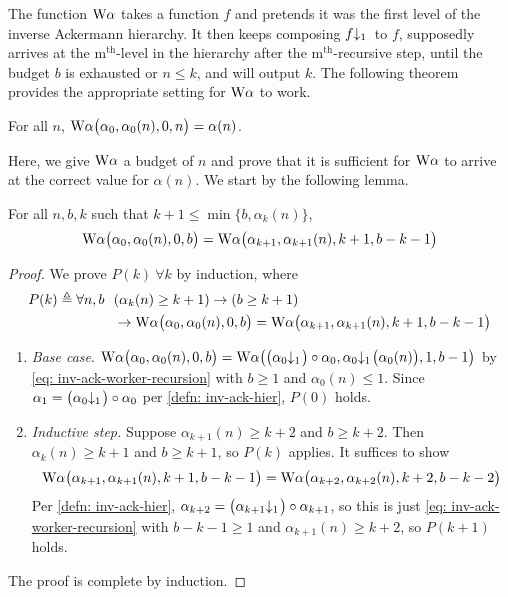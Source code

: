 The function $\text{W}\alpha$ takes a function $f$ and pretends it was the first level of the inverse Ackermann hierarchy. It then keeps composing $\cdt{f}{1}\ $ to $f$, supposedly arrives at the $\text{m}^{\text{th}}$-level in the hierarchy after the $\text{m}^{\text{th}}$-recursive step, until the budget $b$ is exhausted or $n\le k$, and will output $k$. The following theorem provides the appropriate setting for $\text{W}\alpha$ to work.
\begin{thm} \label{thm: inv-ack-worker-correct}
	For all $n$, $\text{W}\alpha\big(\alpha_0, \alpha_0(n), 0, n\big) = \alpha(n)$.
\end{thm}
Here, we give $\text{W}\alpha$ a budget of $n$ and prove that it is sufficient for $\text{W}\alpha$ to arrive at the correct value for $\alpha(n)$. We start by the following lemma.
\begin{lem} \label{lem: inv-ack-worker-intermediate}
	For all $n, b, k$ such that $k+1\le \min\big\{b, \alpha_k(n)\big\}$, \begin{equation*}
	\text{W}\alpha\big(\alpha_0, \alpha_0(n), 0, b\big) = \text{W}\alpha\big(\alpha_{k+1}, \alpha_{k+1}(n), k+1, b-k-1\big)
	\end{equation*}
\end{lem}
\begin{proof}
	 We prove $P(k) \ \forall k$ by induction, where
	 \begin{equation*}
	 \begin{aligned}
	 P(k) \triangleq \forall n, b \ \ & (\alpha_k(n)\ge k+1) \to (b\ge k+1)\\ & \to \text{W}\alpha\big(\alpha_0, \alpha_0(n), 0, b\big) = \text{W}\alpha\big(\alpha_{k+1}, \alpha_{k+1}(n), k+1, b-k-1\big)
	 \end{aligned}
	 \end{equation*}
	\begin{enumerate}[leftmargin=*]
		\item \emph{Base case}. $ \W\alpha\big(\alpha_0, \alpha_0(n), 0, b\big) = \W\alpha\big(\cdt{\big(\alpha_0}{1}\big)\circ \alpha_0, \cdt{\alpha_0}{1}\big(\alpha_0(n)\big), 1, b - 1\big) $ by
		\eqref{eq: inv-ack-worker-recursion} with $b\ge 1$ and $\alpha_0(n)\le 1$. Since $\alpha_1 = \big(\cdt{\alpha_0}{1}\big) \circ \alpha_0$ per \cref{defn: inv-ack-hier}, $P(0)$ holds.
		
		\item \emph{Inductive step.} Suppose $\alpha_{k+1}(n)\ge k+2$ and $b\ge k+2$. Then $\alpha_k(n)\ge k+1$ and $b\ge k+1$, so $P(k)$ applies. It suffices to show
		\begin{equation*}
		\text{W}\alpha\big(\alpha_{k+1}, \alpha_{k+1}(n), k+1, b-k-1\big)
		= \text{W}\alpha\big(\alpha_{k+2}, \alpha_{k+2}(n), k+2, b-k-2\big)
		\end{equation*}
		Per \cref{defn: inv-ack-hier}, $\alpha_{k+2} = \big(\cdt{\alpha_{k+1}}{1}\big)\circ \alpha_{k+1}$, so this is just \eqref{eq: inv-ack-worker-recursion} with $b - k - 1\ge 1$ and $\alpha_{k+1}(n)\ge k+2$, so $P(k+1)$ holds.
	\end{enumerate}
 The proof is complete by induction.
\end{proof}
